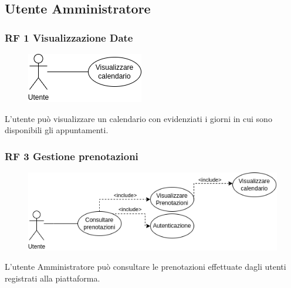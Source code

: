 \documentclass{article}
\begin{document}
\clearpage

\subsection{Utente Amministratore}

\subsubsection{RF 1 Visualizzazione Date}\label{rf_1}
\begin{description}
	    
	\begin{figure}[htp]
		\centering
		\includegraphics[]{rf1.png}
	\end{figure}
	    
	\item L'utente può visualizzare un calendario con evidenziati i giorni in cui sono disponibili gli appuntamenti. 
\end{description}

\subsubsection{RF 3 Gestione prenotazioni}\label{rf_3}
\begin{description}
	
	\begin{figure}[htp]
		\centering
		\includegraphics[width=\textwidth]{rf3.png}
	\end{figure}
	
	\item L'utente Amministratore può consultare le prenotazioni effettuate dagli utenti registrati alla piattaforma.
\end{description}
\end{document}
